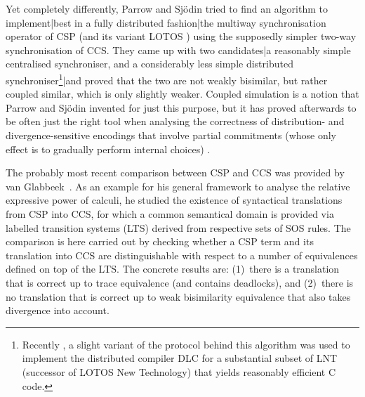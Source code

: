 \documentclass[copyright,creativecommons]{eptcs}
\begin{document}
Yet completely differently, Parrow and Sj{\"o}din \cite{sjodin:phd,parrowCoupled92} tried to find an algorithm to implement|best in a fully distributed fashion|the multiway synchronisation operator of CSP (and its variant LOTOS \cite{DBLP:conf/pstv/Brinksma85}) using the supposedly simpler two-way synchronisation of CCS. They came up with two candidates|a reasonably simple centralised synchroniser, and a considerably less simple distributed synchroniser\footnote{Recently \cite{7092761}, a slight variant of the protocol behind this algorithm was used to implement the distributed compiler DLC for a substantial subset of LNT (successor of LOTOS New Technology) that yields reasonably efficient C code.}|and proved that the two are not weakly bisimilar, but rather coupled similar, which is only slightly weaker. Coupled simulation is a notion that Parrow and Sj\"odin invented for just this purpose, but it has proved afterwards to be often just the right tool when analysing the correctness of distribution- and divergence-sensitive encodings that involve partial commitments (whose only effect is to gradually perform internal choices) \cite{nestmannPierce00}.

The probably most recent comparison between CSP and CCS was provided by van Glabbeek~\cite{DBLP:journals/corr/abs-1208-2750}. As an example for his general framework to analyse the relative expressive power of calculi, he studied the existence of syntactical translations from CSP into CCS, for which a common semantical domain is provided via labelled transition systems (LTS) derived from respective sets of SOS rules. The comparison is here carried out by checking whether a CSP term and its translation into CCS are distinguishable with respect to a number of equivalences defined on top of the LTS. The concrete results are: (1)~there is a translation that is correct up to trace equivalence (and contains deadlocks), and (2)~there is no translation that is correct up to weak bisimilarity equivalence that also takes divergence into account.
\end{document}
